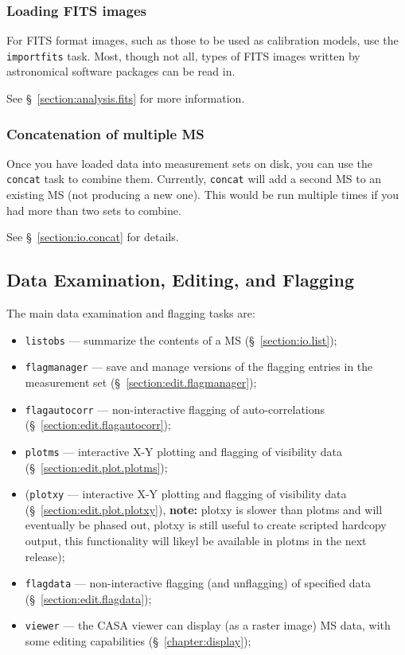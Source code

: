 \subsubsection{Loading FITS images}
\label{section:intro.walkthru.load.imfits}

For FITS format images, such as those to be used as calibration
models, use the {\tt importfits} task.  Most, though not all, types
of FITS images written by astronomical software packages can be
read in.

See \S~\ref{section:analysis.fits} for more information.

\subsubsection{Concatenation of multiple MS}
\label{section:intro.walkthru.load.concat}

Once you have loaded data into measurement sets on disk, you 
can use the {\tt concat} task to combine them.  Currently,
{\tt concat} will add a second MS to an existing MS (not producing
a new one).  This would be run multiple times if you had more than
two sets to combine.

See \S~\ref{section:io.concat} for details.

\subsection{Data Examination, Editing, and Flagging} 
\label{section:intro.walkthru.flag}

The main data examination and flagging tasks are:
\begin{itemize}
   \item {\tt listobs} --- summarize the contents of a MS 
         (\S~\ref{section:io.list});
   \item {\tt flagmanager} --- save and manage versions of the
         flagging entries in the measurement set
         (\S~\ref{section:edit.flagmanager});
   \item {\tt flagautocorr} --- non-interactive flagging of
         auto-correlations (\S~\ref{section:edit.flagautocorr});
   \item {\tt plotms} --- interactive X-Y plotting and flagging of
         visibility data (\S~\ref{section:edit.plot.plotms});
   \item ({\tt plotxy} --- interactive X-Y plotting and flagging of
         visibility data (\S~\ref{section:edit.plot.plotxy}), {\bf
           note:} plotxy is slower than plotms and will eventually be
         phased out, plotxy is still useful to create scripted
         hardcopy output, this functionality will likeyl be available
         in plotms in the next release);
   \item {\tt flagdata} --- non-interactive flagging (and unflagging)
         of specified data (\S~\ref{section:edit.flagdata});
   \item {\tt viewer} --- the CASA viewer can display (as a raster
         image) MS data, with some editing capabilities 
         (\S~\ref{chapter:display});
\end{itemize}

